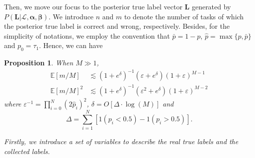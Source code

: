 \documentclass{article}
\makeatletter
\newtheorem{proposition}[theorem]{Proposition}
\renewenvironment{proof}[1][\proofname]{\par
  \vspace{-\topsep}%
  \pushQED{\qed}%
  \normalfont
  \topsep0pt \partopsep0pt %
  \trivlist
  \item[\hskip\labelsep
        \itshape
    #1\@addpunct{.}]\ignorespaces
}{%
  \popQED\endtrivlist\@endpefalse
  \addvspace{0pt plus 0pt} %
}
\makeatother
\begin{document}
Then, we move our focus to the posterior true label vector $\bm{L}$ generated by $P(\bm{L}|\mathcal{L},\bm{\alpha}, \bm{\beta})$.
We introduce $n$ and $m$ to denote the number of tasks of which the posterior true label is correct and wrong, respectively.
Besides, for the simplicity of notations, we employ the convention that $\bar{p}=1-p$, $\hat{p}=\max \{p, \bar{p}\}$ and $p_0=\tau_1$. Hence, we can have
\begin{proposition}
\label{ConvBound}
When $M\gg 1$,
\begin{align}
\mathbb{E}[m/M]&\lesssim (1+e^{\delta})^{-1}(\varepsilon+e^{\delta})(1+\varepsilon)^{M-1}\\
\mathbb{E}[m/M]^2&\lesssim (1+e^{\delta})^{-1}(\varepsilon^2+e^{\delta})(1+\varepsilon)^{M-2}
\end{align}
where $\varepsilon^{-1}=\prod_{i=0}^{N}(2\hat{p}_i)^{2}$, $\delta=O[\Delta\cdot \log(M)]$ and 
$$\Delta={\sum}_{i=1}^N[1(p_i<0.5)-1(p_i>0.5)].$$
\begin{proof}
Firstly, we introduce a set of variables to describe the real true labels and the collected labels.

\end{proof}
\end{proposition}
\end{document}
